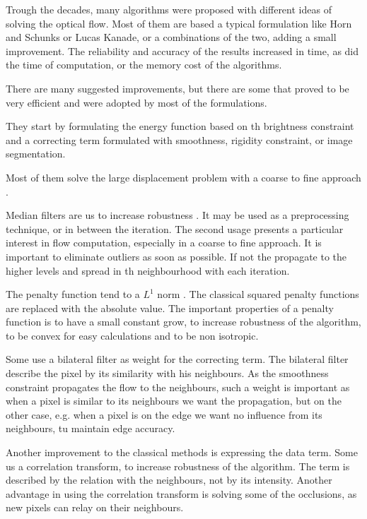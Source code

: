 \documentclass[12pt,a4paper,twoside]{report}
\begin{document}
{Trough the decades, many algorithms were proposed with different ideas of solving the optical flow. Most of them are based a typical formulation like Horn and Schunks or Lucas Kanade, or a combinations of the two, adding a small improvement. The reliability and  accuracy of the results increased in time, as did the time of computation, or the memory cost of the algorithms. 

There are many suggested improvements, but there are some that proved to be very efficient and were adopted by most of the formulations.

They start by formulating the energy function based on th brightness constraint and a correcting term formulated with smoothness, rigidity constraint,  or image segmentation. 

Most of them solve the large displacement problem with a coarse to fine approach \cite{bergen1992hierarchical}.

Median filters are us to increase robustness \cite{bab1998robust}. It may be used as a preprocessing technique, or in between the iteration. The second usage presents a particular interest in flow computation, especially in a coarse to fine approach. It is important to eliminate outliers as soon as possible. If not the propagate to the higher levels and spread in th neighbourhood with each iteration.

The penalty function tend to a $L^1$ norm \cite{wedel2008,wedel2009}. The classical squared penalty functions are replaced with the absolute value. The important properties of a penalty function is to have a small constant grow, to increase robustness of the algorithm, to be convex for easy calculations and to be non isotropic.

Some use a bilateral filter as weight for the correcting term\cite{drulea2013}. The bilateral filter describe the pixel by its similarity with his neighbours. As the smoothness constraint propagates the flow to the neighbours, such a weight is important as when a pixel is similar to its neighbours we want the propagation, but on the other case, e.g. when a pixel is on the edge we want no influence from its neighbours, tu maintain edge accuracy. 

Another improvement to the classical methods is expressing the data term. Some us a correlation transform, to increase robustness of the algorithm\cite{molnar2010illumination}. The term is described by the relation with the neighbours, not by its intensity. Another advantage in using the correlation transform is solving some of the occlusions, as new pixels can relay on their neighbours.

}
\end{document}
